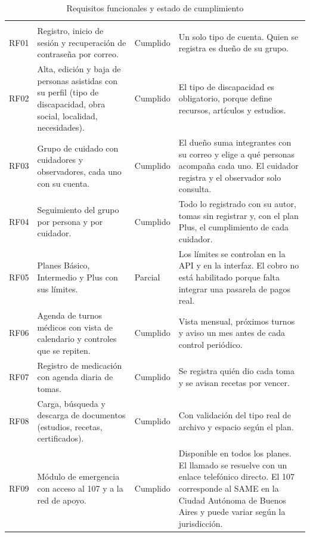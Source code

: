 {\small
\begin{xltabular}{\textwidth}{l >{\raggedright\arraybackslash}X l >{\raggedright\arraybackslash}X}
\caption{Requisitos funcionales y estado de cumplimiento}\label{tab:rf}\\
\toprule
{} &  &  &  \\
\midrule
\endfirsthead
\toprule
{} &  &  &  \\
\midrule
\endhead
\bottomrule
\endfoot
RF01 & Registro, inicio de sesión y recuperación de contraseña por correo. & Cumplido & Un solo tipo de cuenta. Quien se registra es dueño de su grupo. \\
RF02 & Alta, edición y baja de personas asistidas con su perfil (tipo de discapacidad, obra social, localidad, necesidades). & Cumplido & El tipo de discapacidad es obligatorio, porque define recursos, artículos y estudios. \\
RF03 & Grupo de cuidado con cuidadores y observadores, cada uno con su cuenta. & Cumplido & El dueño suma integrantes con su correo y elige a qué personas acompaña cada uno. El cuidador registra y el observador solo consulta. \\
RF04 & Seguimiento del grupo por persona y por cuidador. & Cumplido & Todo lo registrado con su autor, tomas sin registrar y, con el plan Plus, el cumplimiento de cada cuidador. \\
RF05 & Planes Básico, Intermedio y Plus con sus límites. & Parcial & Los límites se controlan en la API y en la interfaz. El cobro no está habilitado porque falta integrar una pasarela de pagos real. \\
RF06 & Agenda de turnos médicos con vista de calendario y controles que se repiten. & Cumplido & Vista mensual, próximos turnos y aviso un mes antes de cada control periódico. \\
RF07 & Registro de medicación con agenda diaria de tomas. & Cumplido & Se registra quién dio cada toma y se avisan recetas por vencer. \\
RF08 & Carga, búsqueda y descarga de documentos (estudios, recetas, certificados). & Cumplido & Con validación del tipo real de archivo y espacio según el plan. \\
RF09 & Módulo de emergencia con acceso al 107 y a la red de apoyo. & Cumplido & Disponible en todos los planes. El llamado se resuelve con un enlace telefónico directo. El 107 corresponde al SAME en la Ciudad Autónoma de Buenos Aires y puede variar según la jurisdicción. \\

\end{xltabular}}
